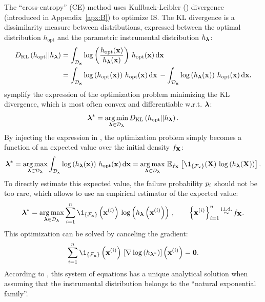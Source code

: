 The ``cross-entropy'' (CE) method \citep{rubinstein_2004_CE} uses Kullback-Leibler () divergence (introduced in Appendix~\ref{apx:B}) to optimize IS. 
The KL divergence is a dissimilarity measure between distributions, expressed between the optimal distribution $h_{\mathrm{opt}}$ and the parametric instrumental distribution $h_{\boldsymbol{\lambda}}$: 
\begin{subequations}
    \begin{align}
        D_{\mathrm{KL}}\left(h_{\mathrm{opt}} || h_{\boldsymbol{\lambda}}\right) &= \int_{\mathcal{D}_{\bf x}} \log \left(\frac{h_{\mathrm{opt}}({\bf x})}{h_{\boldsymbol{\lambda}}({\bf x})}\right) \, h_{\mathrm{opt}}({\bf x}) \, \mathrm{d} {\bf x}\\
            &= \int_{\mathcal{D}_{\bf x}} \log\left(h_{\mathrm{opt}}({\bf x})\right) \, h_{\mathrm{opt}}({\bf x}) \, \mathrm{d} {\bf x} \, - \int_{\mathcal{D}_{\bf x}} \log\left(h_{\boldsymbol{\lambda}}({\bf x})\right) \, h_{\mathrm{opt}}({\bf x}) \, \mathrm{d} {\bf x}.
    \label{eq:KL}
    \end{align}
\end{subequations}
\citet{rubinstein_2004_CE} symplify the expression of the optimization problem minimizing the KL divergence, which is most often convex and differentiable w.r.t. ${\boldsymbol{\lambda}}$:  
\begin{equation}
    {\boldsymbol{\lambda}}^* = \operatorname*{arg\,min}_{{\boldsymbol{\lambda}} \in \mathcal{D}_{\boldsymbol{\lambda}}} D_{\mathrm{KL}}\left(h_{\mathrm{opt}} || h_{\boldsymbol{\lambda}}\right). 
\end{equation}
By injecting the expression in , the optimization problem simply becomes a function of an expected value over the initial density $f_{\bf X}$:
\begin{equation}
    \blambda^* = \argmax_{\blambda \in \iD_\blambda} \int_{\iD_\bx} \log\left(h_\blambda(\bx)\right) \, h_{\mathrm{opt}}(\bx) \, \dd \bx
                = \argmax_{\blambda \in \iD_\blambda} \, \E_{f_\bX}\left[\1_{\{\iF_\bx\}}(\bX) \, \log\left(h_\blambda(\bX)\right) \right].
    \label{eq:empirical_KL}
\end{equation}
To directly estimate this expected value, the failure probability $p_\mathrm{f}$ should not be too rare, which allows to use an empirical estimator of the expected value:
\begin{equation}
        \blambda^* = \argmax_{\blambda \in \iD_\blambda} \sum_{i=1}^{n} \1_{\{\iF_\bx\}}\left(\bx^{(i)}\right) \, \log\left(h_\blambda\left(\bx^{(i)}\right)\right) \, , \qquad
        \left\{ \bx^{(i)} \right\}_{i=1}^n \simiid f_\bX.
\end{equation}
This optimization can be solved by canceling the gradient: 
\begin{equation}
    \sum_{i=1}^{n} \1_{\{\iF_\bx\}}\left(\bx^{(i)}\right) \, \left[\nabla \log\left(h_{\blambda^*}\right)\right]\left(\bx^{(i)}\right) = \mathbf{0}.
\end{equation}
According to \citet{rubinstein_2004_CE}, this system of equations has a unique analytical solution when assuming that the instrumental distribution belongs to the ``natural exponential family''. 

